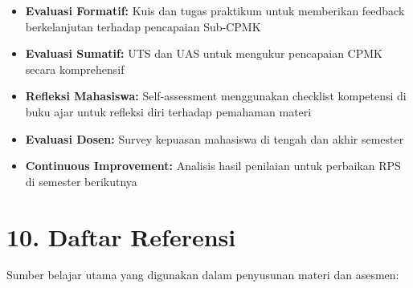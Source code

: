 \documentclass[12pt,a4paper]{article}
\begin{document}
\begin{itemize}[leftmargin=*]
  \item \textbf{Evaluasi Formatif:} Kuis dan tugas praktikum untuk memberikan feedback berkelanjutan terhadap pencapaian Sub-CPMK
  \item \textbf{Evaluasi Sumatif:} UTS dan UAS untuk mengukur pencapaian CPMK secara komprehensif
  \item \textbf{Refleksi Mahasiswa:} Self-assessment menggunakan checklist kompetensi di buku ajar untuk refleksi diri terhadap pemahaman materi
  \item \textbf{Evaluasi Dosen:} Survey kepuasan mahasiswa di tengah dan akhir semester
  \item \textbf{Continuous Improvement:} Analisis hasil penilaian untuk perbaikan RPS di semester berikutnya
\end{itemize}

\vspace{0.5cm}

\section*{10. Daftar Referensi}

Sumber belajar utama yang digunakan dalam penyusunan materi dan asesmen:
\end{document}
